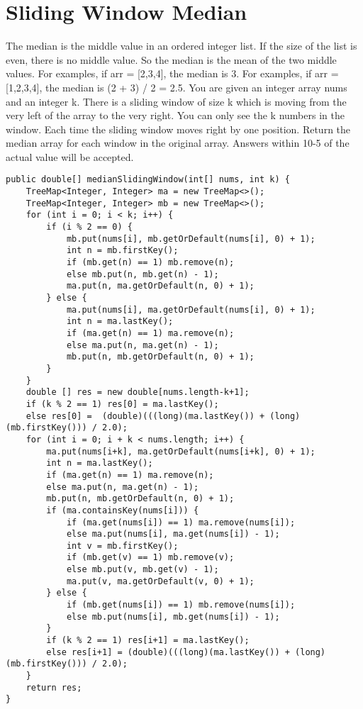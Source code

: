 \documentclass[9pt, b5paaper]{book}
\begin{document}
\section{Sliding Window Median}
\label{sec-4-2}
The median is the middle value in an ordered integer list. If the size of the list is even, there is no middle value. So the median is the mean of the two middle values.
For examples, if arr = [2,3,4], the median is 3.
For examples, if arr = [1,2,3,4], the median is (2 + 3) / 2 = 2.5.
You are given an integer array nums and an integer k. There is a sliding window of size k which is moving from the very left of the array to the very right. You can only see the k numbers in the window. Each time the sliding window moves right by one position.
Return the median array for each window in the original array. Answers within 10-5 of the actual value will be accepted.
\begin{verbatim}
public double[] medianSlidingWindow(int[] nums, int k) {
    TreeMap<Integer, Integer> ma = new TreeMap<>();
    TreeMap<Integer, Integer> mb = new TreeMap<>();
    for (int i = 0; i < k; i++) {
        if (i % 2 == 0) {
            mb.put(nums[i], mb.getOrDefault(nums[i], 0) + 1);
            int n = mb.firstKey();
            if (mb.get(n) == 1) mb.remove(n);
            else mb.put(n, mb.get(n) - 1);
            ma.put(n, ma.getOrDefault(n, 0) + 1);
        } else {
            ma.put(nums[i], ma.getOrDefault(nums[i], 0) + 1);
            int n = ma.lastKey();
            if (ma.get(n) == 1) ma.remove(n);
            else ma.put(n, ma.get(n) - 1);
            mb.put(n, mb.getOrDefault(n, 0) + 1);
        }
    }
    double [] res = new double[nums.length-k+1];
    if (k % 2 == 1) res[0] = ma.lastKey();
    else res[0] =  (double)(((long)(ma.lastKey()) + (long)(mb.firstKey())) / 2.0);
    for (int i = 0; i + k < nums.length; i++) {
        ma.put(nums[i+k], ma.getOrDefault(nums[i+k], 0) + 1);
        int n = ma.lastKey();
        if (ma.get(n) == 1) ma.remove(n);
        else ma.put(n, ma.get(n) - 1);
        mb.put(n, mb.getOrDefault(n, 0) + 1);
        if (ma.containsKey(nums[i])) {
            if (ma.get(nums[i]) == 1) ma.remove(nums[i]);
            else ma.put(nums[i], ma.get(nums[i]) - 1);
            int v = mb.firstKey();
            if (mb.get(v) == 1) mb.remove(v);
            else mb.put(v, mb.get(v) - 1);
            ma.put(v, ma.getOrDefault(v, 0) + 1);
        } else {
            if (mb.get(nums[i]) == 1) mb.remove(nums[i]);
            else mb.put(nums[i], mb.get(nums[i]) - 1);
        }
        if (k % 2 == 1) res[i+1] = ma.lastKey();
        else res[i+1] = (double)(((long)(ma.lastKey()) + (long)(mb.firstKey())) / 2.0);
    }
    return res;
}
\end{verbatim}
\end{document}
